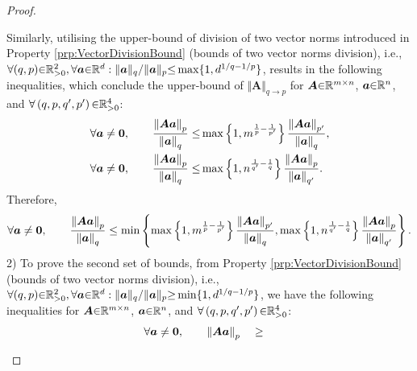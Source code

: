 \begin{proof}
\begin{itemize}
Similarly, utilising the upper-bound of division of two vector norms introduced in Property \ref{prp:VectorDivisionBound} (bounds of two vector norms division), i.e., $\forall (q , p) {\in} \mathbb{R}^2_{{>} 0}, \forall \boldsymbol{a} {\in} \mathbb{R}^d : \Vert \boldsymbol{a} \Vert_q / \Vert \boldsymbol{a} \Vert_p {\leq} \max \{1 , d^{1/q - 1/p} \}$, results in the following inequalities, which conclude the upper-bound of $\Vert \boldsymbol{A} \Vert_{q {\to} p}$ for $\boldsymbol{A} {\in} \mathbb{R}^{m {\times} n}$, $\boldsymbol{a} {\in} \mathbb{R}^n$, and $\forall \left( q , p , q' , p' \right) {\in} \mathbb{R}^4_{>0}$:
\begin{gather*}
\begin{aligned}
\forall \boldsymbol{a} \neq \boldsymbol{0}, \qquad \frac{\left\lVert\boldsymbol{A} \boldsymbol{a}\right\rVert_p}{\left\lVert\boldsymbol{a}\right\rVert_q} \leq
&\max \left\lbrace 1 , m^{\frac1p - \frac{1}{p'}} \right\rbrace \frac{\left\lVert\boldsymbol{A} \boldsymbol{a}\right\rVert_{p'}}{\left\lVert\boldsymbol{a}\right\rVert_q}, \\
\forall \boldsymbol{a} \neq \boldsymbol{0}, \qquad \frac{\left\lVert\boldsymbol{A} \boldsymbol{a}\right\rVert_p}{\left\lVert\boldsymbol{a}\right\rVert_q} \leq
&\max \left\lbrace 1 , n^{\frac{1}{q'} - \frac1q} \right\rbrace \frac{\left\lVert\boldsymbol{A} \boldsymbol{a}\right\rVert_p}{\left\lVert\boldsymbol{a}\right\rVert_{q'}}.
\end{aligned}
\end{gather*}
Therefore,
\begin{gather*}
\forall \boldsymbol{a} \neq \boldsymbol{0}, \qquad \frac{\left\lVert\boldsymbol{A} \boldsymbol{a}\right\rVert_p}{\left\lVert\boldsymbol{a}\right\rVert_q} \leq
\min \left\lbrace \max \left\lbrace 1 , m^{\frac1p - \frac{1}{p'}} \right\rbrace \frac{\left\lVert\boldsymbol{A} \boldsymbol{a}\right\rVert_{p'}}{\left\lVert\boldsymbol{a}\right\rVert_q}, 
\max \left\lbrace 1 , n^{\frac{1}{q'} - \frac1q} \right\rbrace \frac{\left\lVert\boldsymbol{A} \boldsymbol{a}\right\rVert_p}{\left\lVert\boldsymbol{a}\right\rVert_{q'}} \right\rbrace.
\end{gather*}
2) To prove the second set of bounds, from Property \ref{prp:VectorDivisionBound} (bounds of two vector norms division), i.e., $\forall (q , p) {\in} \mathbb{R}^2_{{>} 0}, \forall \boldsymbol{a} {\in} \mathbb{R}^d : \Vert \boldsymbol{a} \Vert_q / \Vert \boldsymbol{a} \Vert_p {\geq} \min \{1 , d^{1/q - 1/p} \}$, we have the following inequalities for $\boldsymbol{A} {\in} \mathbb{R}^{m {\times} n}$, $\boldsymbol{a} {\in} \mathbb{R}^n$, and $\forall \left( q , p , q' , p' \right) {\in} \mathbb{R}^4_{>0}$:
\begin{gather*}
\begin{aligned}
&\forall \boldsymbol{a} \neq \boldsymbol{0}, \qquad \mynorm{\boldsymbol{A} \boldsymbol{a}}_p &&\geq

\end{aligned}
\end{gather*}
\end{itemize}
\end{proof}

